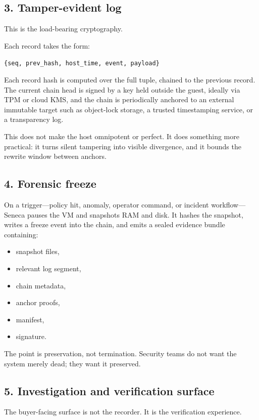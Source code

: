 \documentclass[11pt]{article}
\begin{document}
\subsection{3. Tamper-evident log}

This is the load-bearing cryptography.

Each record takes the form:
\begin{center}
\texttt{\{seq, prev\_hash, host\_time, event, payload\}}
\end{center}

Each record hash is computed over the full tuple, chained to the previous record. The current chain head is signed by a key held outside the guest, ideally via TPM or cloud KMS, and the chain is periodically anchored to an external immutable target such as object-lock storage, a trusted timestamping service, or a transparency log.

This does not make the host omnipotent or perfect. It does something more practical: it turns silent tampering into visible divergence, and it bounds the rewrite window between anchors.

\subsection{4. Forensic freeze}

On a trigger---policy hit, anomaly, operator command, or incident workflow---Seneca pauses the VM and snapshots RAM and disk. It hashes the snapshot, writes a freeze event into the chain, and emits a sealed evidence bundle containing:
\begin{itemize}[leftmargin=1.5em]
    \item snapshot files,
    \item relevant log segment,
    \item chain metadata,
    \item anchor proofs,
    \item manifest,
    \item signature.
\end{itemize}

The point is preservation, not termination. Security teams do not want the system merely dead; they want it preserved.

\subsection{5. Investigation and verification surface}

The buyer-facing surface is not the recorder. It is the verification experience.
\end{document}
